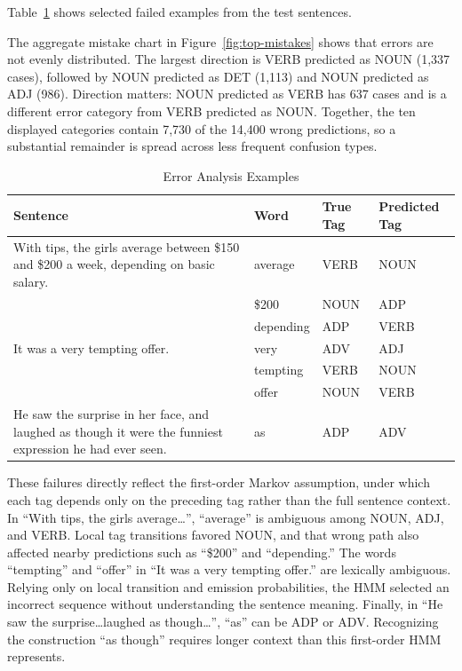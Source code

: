 \documentclass[12pt,a4paper]{article}
\begin{document}
Table~\ref{tab:error-examples} shows selected failed examples from the test
sentences.

The aggregate mistake chart in Figure~\ref{fig:top-mistakes} shows that errors
are not evenly distributed. The largest direction is VERB predicted as NOUN
(1,337 cases), followed by NOUN predicted as DET (1,113) and NOUN predicted as
ADJ (986). Direction matters: NOUN predicted as VERB has 637 cases and is a
different error category from VERB predicted as NOUN. Together, the ten displayed
categories contain 7,730 of the 14,400 wrong predictions, so a substantial
remainder is spread across less frequent confusion types.

\begin{table}[!t]
    \centering
    \fontsize{9.5}{11}\selectfont
    \begin{tabular}{p{}p{}p{}p{}}
        \toprule
        \textbf{Sentence} & \textbf{Word} & \textbf{True Tag} & \textbf{Predicted Tag} \\
        \midrule
        With tips, the girls average between \$150 and \$200 a week, depending on basic salary.
        & average & VERB & NOUN \\
        & \$200 & NOUN & ADP \\
        & depending & ADP & VERB \\
        \midrule
        It was a very tempting offer.
        & very & ADV & ADJ \\
        & tempting & VERB & NOUN \\
        & offer & NOUN & VERB \\
        \midrule
        He saw the surprise in her face, and laughed as though it were the funniest expression he had ever seen.
        & as & ADP & ADV \\
        \bottomrule
    \end{tabular}
    \caption{Error Analysis Examples}
    \label{tab:error-examples}
\end{table}

These failures directly reflect the first-order Markov assumption, under which
each tag depends only on the preceding tag rather than the full sentence context.
In ``With tips, the girls average\ldots'', ``average'' is ambiguous among NOUN,
ADJ, and VERB. Local tag transitions favored NOUN, and that wrong path also
affected nearby predictions such as ``\$200'' and ``depending.'' The words ``tempting'' and ``offer'' in ``It was a very tempting offer.''
are lexically ambiguous.
Relying only on local transition and emission probabilities, the HMM selected an
incorrect sequence without understanding the sentence meaning. Finally, in ``He
saw the surprise\ldots laughed as though\ldots'', ``as'' can be ADP or ADV.
Recognizing the construction ``as though'' requires longer context than this
first-order HMM represents.
\end{document}
